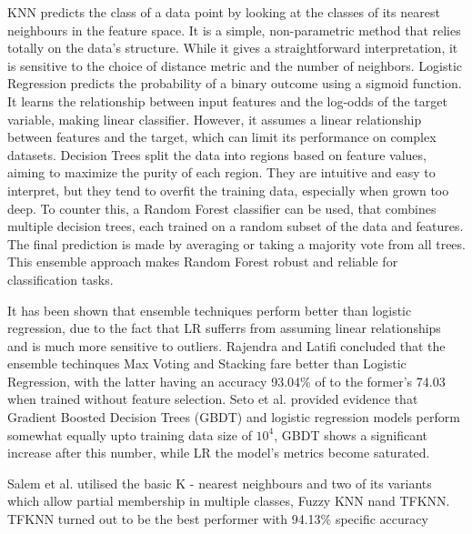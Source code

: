 \documentclass{article}
\begin{document}
\begin{multicols}{2}
KNN predicts the class of a data point by looking at the classes of its nearest neighbours in the feature space. It is a simple, non-parametric method that relies totally on the data’s structure. While it gives a straightforward interpretation, it is sensitive to the choice of distance metric and the number of neighbors.
Logistic Regression predicts the probability of a binary outcome using a sigmoid function. It learns the relationship between input features and the log-odds of the target variable, making linear classifier. However, it assumes a linear relationship between features and the target, which can limit its performance on complex datasets.
Decision Trees split the data into regions based on feature values, aiming to maximize the purity of each region. 
They are intuitive and easy to interpret, but they tend to overfit the training data, especially when grown too deep.
To counter this, a Random Forest classifier can be used, that combines multiple decision trees, each trained on a random subset of the data and features. The final prediction is made by averaging or taking a majority vote from all trees. This ensemble approach makes Random Forest robust and reliable for classification tasks.

It has been shown that ensemble techniques perform better than logistic regression, due to the fact that LR sufferrs from assuming linear relationships and is much more sensitive to outliers.
Rajendra and Latifi concluded that the ensemble techinques Max Voting and Stacking fare better than Logistic Regression, with the latter having an accuracy 93.04\% of to the former's 74.03 when trained without feature selection\cite{rajendra2021prediction}.
Seto et al. provided evidence that Gradient Boosted Decision Trees (GBDT) and logistic regression models perform somewhat equally upto training data size of $10^{4}$, GBDT shows a significant increase after this number, while LR the model's metrics become saturated\cite{seto2022gradient}.

Salem et al. utilised the basic K - nearest neighbours and two of its variants which allow partial membership in multiple classes, Fuzzy KNN nand TFKNN. TFKNN turned out to be the best performer with 94.13\% specific accuracy\cite{salem2022fine}



%
%
%
\fontsize{8}{2}\selectfont



\end{multicols}
\end{document}
